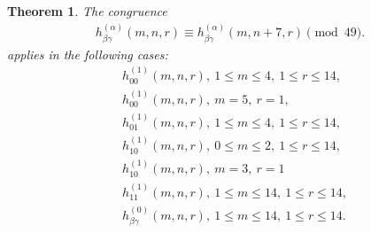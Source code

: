 \documentclass[reqno]{amsart}
\newtheorem{theorem}{Theorem}[section]
\theoremstyle{definition}
\theoremstyle{remark}
\numberwithin{equation}{section}
\begin{document}
\begin{theorem}\label{hcongred37}
The congruence
\begin{align}
h^{(\alpha)}_{\beta\gamma}(m,n,r)\equiv h^{(\alpha)}_{\beta\gamma}(m,n+7,r)\pmod{49}.\label{congcondh}
\end{align} applies in the following cases:
\begin{align}
&h^{(1)}_{00}(m,n,r),\ 1\le m\le 4,\ 1\le r\le 14,\label{congcondh100}\\
&h^{(1)}_{00}(m,n,r),\ m=5,\ r=1,\label{congcondh100a}\\
&h^{(1)}_{01}(m,n,r),\ 1\le m\le 4,\ 1\le r\le 14,\label{congcondh101}\\
&h^{(1)}_{10}(m,n,r),\ 0\le m\le 2,\ 1\le r\le 14,\label{congcondh110}\\
&h^{(1)}_{10}(m,n,r),\ m=3,\ r=1\label{congcondh110a}\\
&h^{(1)}_{11}(m,n,r),\ 1\le m\le 14,\ 1\le r\le 14,\label{congcondh111}\\
&h^{(0)}_{\beta\gamma}(m,n,r),\ 1\le m\le 14,\ 1\le r\le 14.\label{congcondh000}
\end{align}
\end{theorem}
\end{document}
